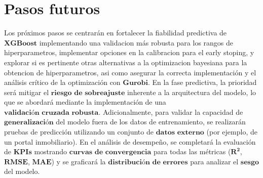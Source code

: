 \section{Pasos futuros \label{sec:sec1}}
Los próximos pasos se centrarán en fortalecer la fiabilidad predictiva de $\mathbf{XGBoost}$ implementando una validacion más robusta para los rangos de hiperparametros, implementar opciones en la calibracion para el early stoping, y explorar si es pertinente otras alternativas a la optimizacion bayesiana para la obtencion de hiperparametros, asi como asegurar la correcta implementación y el análisis crítico de la optimización con $\mathbf{Gurobi}$. En la fase predictiva, la prioridad será mitigar el $\mathbf{\text{riesgo de sobreajuste}}$ inherente a la arquitectura del modelo, lo que se abordará mediante la implementación de una $\mathbf{\text{validación cruzada robusta}}$. Adicionalmente, para validar la capacidad de $\mathbf{\text{generalización}}$ del modelo fuera de los datos de entrenamiento, se realizarán pruebas de predicción utilizando un conjunto de $\mathbf{\text{datos externo}}$ (por ejemplo, de un portal inmobiliario). En el análisis de desempeño, se completará la evaluación de $\mathbf{KPIs}$ mostrando $\mathbf{\text{curvas de convergencia}}$ para todas las métricas ($\mathbf{R^2}$, $\mathbf{\text{RMSE}}$, $\mathbf{\text{MAE}}$) y se graficará la $\mathbf{\text{distribución de errores}}$ para analizar el $\mathbf{\text{sesgo}}$ del modelo.

